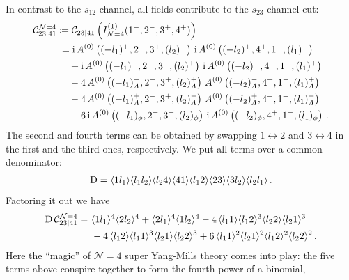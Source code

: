 In contrast to the $s_{12}$ channel, all fields contribute to the $s_{23}$-channel cut:
\begin{align}
\begin{aligned}
\mathcal{C}_{23|41}^{\mathcal{N}=4} & \coloneqq \mathcal{C}_{23|41}\left(I^{(1)}_{\mathcal{N}=4}(1^-,2^-,3^+,4^+) \right)  \\
& \phantom{:} =  \i \, A^{(0)}\left( (-l_1)^{+},2^-,3^+,(l_2)^{-} \right)
  \, \i \, A^{(0)}\left( (-l_2)^{+},4^+,1^-,(l_1)^{-} \right) \\
  & \phantom{{} \coloneqq}  + \i \, A^{(0)}\left( (-l_1)^{-},2^-,3^+,(l_2)^{+} \right)
  \, \i \, A^{(0)}\left( (-l_2)^{-},4^+,1^-,(l_1)^{+} \right) \\
  &  \phantom{{} \coloneqq}  - 4 \, A^{(0)}\left( (-l_1)^{-}_{\Lambda},2^-,3^+,(l_2)^{+}_{\Lambda} \right) \,
  A^{(0)}\left( (-l_2)^{-}_{\Lambda},4^+,1^-,(l_1)^{+}_{\Lambda} \right) \\ 
  &  \phantom{{} \coloneqq}  - 4 \, A^{(0)}\left( (-l_1)^{+}_{\Lambda},2^-,3^+,(l_2)^{-}_{\Lambda} \right) \,
  A^{(0)}\left( (-l_2)^{+}_{\Lambda},4^+,1^-,(l_1)^{-}_{\Lambda} \right) \\ 
  &  \phantom{{} \coloneqq}  + 6 \, \i \, A^{(0)}\left( (-l_1)_{\phi},2^-,3^+,(l_2)_{\phi} \right) \, \i \,
  A^{(0)}\left( (-l_2)_{\phi},4^+,1^-,(l_1)_{\phi} \right) \,.
\end{aligned}
\end{align}
The second and fourth terms can be obtained by swapping $1 \leftrightarrow 2$ and $3 \leftrightarrow 4$ in the first and the third ones, respectively. We put all terms over a common denominator:
\begin{align}
{\rm D} = \langle 1 l_1 \rangle \langle l_1 l_2 \rangle \langle l_2 4 \rangle \langle 4 1 \rangle \langle l_1 2 \rangle \langle 23 \rangle \langle 3 l_2 \rangle \langle l_2 l_1 \rangle \,.
\end{align}
Factoring it out we have
\begin{align}
\begin{aligned}
{\rm D} \, \mathcal{C}_{23|41}^{\mathcal{N}=4} = \ & \langle 1 l_1 \rangle^4  \langle 2 l_2 \rangle^4 + \langle 2 l_1 \rangle^4 \langle 1 l_2 \rangle^4 - 4 \, \langle l_1 1 \rangle \langle l_1 2 \rangle^3 \langle l_2 2 \rangle \langle l_2 1 \rangle^3 \\
 & - 4 \, \langle l_1 2 \rangle \langle l_1 1 \rangle^3 \langle l_2 1 \rangle \langle l_2 2 \rangle^3   + 6 \, \langle l_1 1 \rangle^2  \langle l_2 1 \rangle^2  \langle l_1 2 \rangle^2  \langle l_2 2 \rangle^2\,.
\end{aligned}
\end{align}
Here the ``magic'' of $\mathcal{N}=4$ super Yang-Mills theory comes into play: the five terms above conspire together to form the fourth power of a binomial, 
